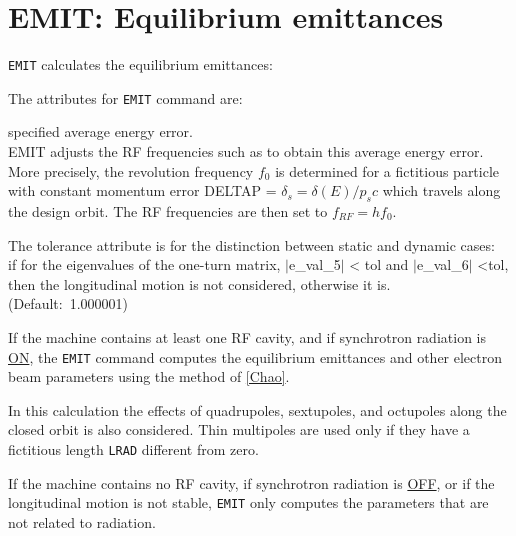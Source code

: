 
\chapter{EMIT: Equilibrium emittances} 
\label{chap:emit}

\texttt{EMIT} calculates the equilibrium emittances: 

\vspace{5mm}

The attributes for \texttt{EMIT} command are: 

\begin{madlist}
   specified average energy error. \\
  EMIT adjusts the RF frequencies such as to obtain this
  average energy error. More precisely, the revolution frequency $f_0$
  is determined for a fictitious particle with constant momentum error  
  DELTAP = $\delta_s = \delta(E) / p_s c$ which travels along the design
  orbit. The RF frequencies are then set to   
  $f_{RF} = h f_0$. 

   The tolerance attribute is for the distinction between
  static and dynamic cases: \\
  if for the eigenvalues of the one-turn matrix, $|$e\_val\_5$|$ \textless
  tol and $|$e\_val\_6$|$ \textless tol, then the longitudinal motion is
  not considered, otherwise it is. \\
  (Default:~1.000001)  
\end{madlist}


If the machine contains at least one RF cavity, and if synchrotron
radiation is \href{../Introduction/beam.html#radiate}{ON}, the
\texttt{EMIT} command computes the equilibrium emittances and other
electron beam parameters using the method of 
\href{../Introduction/bibliography.html#chao}{[Chao]}. 

In this calculation the effects of quadrupoles, sextupoles, and
octupoles along the closed orbit is also considered. Thin multipoles are
used only if they have a fictitious length \texttt{LRAD} different from zero.  

If the machine contains no RF cavity, if synchrotron radiation is
\href{../Introduction/beam.html#radiate}{OFF}, or if the longitudinal
motion is not stable, \texttt{EMIT} only computes the parameters that
are not related to radiation.  

